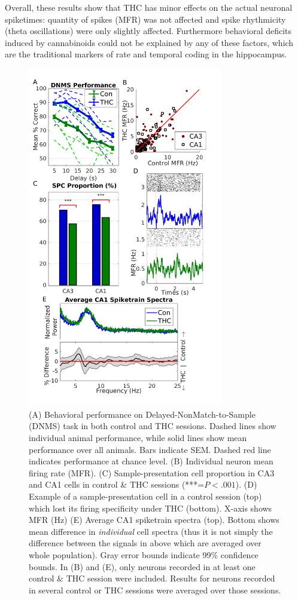 \documentclass[11pt,a4paper,final]{article}
\begin{document}
Overall, these results show that THC has minor effects on the actual neuronal spiketimes: quantity of spikes (MFR) was not affected and spike rhythmicity (theta oscillations) were only slightly affected.
Furthermore behavioral deficits induced by cannabinoids could not be explained by any of these factors, which are the traditional markers of rate and temporal coding in the hippocampus.

\begin{figure}[!ht]
\centering
\includegraphics[width=85mm]{sig}
\caption[Signal Analysis]{
(A) Behavioral performance on Delayed-NonMatch-to-Sample (DNMS) task in both control and THC sessions. Dashed lines show individual animal performance, while solid lines show mean performance over all animals. Bars indicate SEM. Dashed red line indicates performance at chance level.
(B) Individual neuron mean firing rate (MFR).
(C) Sample-presentation cell proportion in CA3 and CA1 cells in control \& THC sessions (***=$P<.001$). 
(D) Example of a sample-presentation cell in a control session (top) which lost its firing specificity under THC (bottom). X-axis shows MFR (Hz)
(E) Average CA1 spiketrain spectra (top). Bottom shows mean difference in \textit{individual} cell spectra (thus it is not simply the difference between the signals in above which are averaged over whole population). Gray error bounds indicate 99\% confidence bounds.
In (B) and (E), only neurons recorded in at least one control \& THC session were included. Results for neurons recorded in several control or THC sessions were averaged over those sessions.}
\label{sig}
\end{figure}
\end{document}
